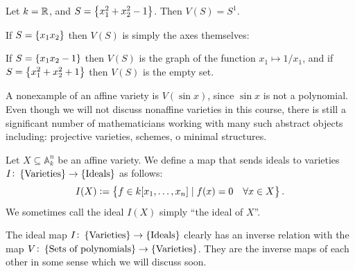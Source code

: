 \documentclass[11pt,a4paper]{article}
\newcommand{\A}{\mathbb A}
\begin{document}
\begin{example}
  Let $k = \mathbb{R}$, and $S = \left\{x_1^2 + x_2^2 - 1\right\}$.
  Then $V(S) = S^1$.
  \begin{center}
  \end{center}
  If $S = \left\{x_1 x_2\right\}$ then $V(S)$ is simply the axes themselves:
  \begin{center}
  \end{center}
  If $S = \left\{x_1 x_2 - 1\right\}$ then $V(S)$ is the graph of the function
  $x_1 \mapsto 1/x_1$,
  and if $S = \left\{x_1^2 + x_2^2 + 1\right\}$ then $V(S)$ is the empty set.
\end{example}

\begin{remark}
  A nonexample of an affine variety is $V(\sin x)$,
  since $\sin x$ is not a polynomial.
  Even though we will not discuss nonaffine varieties in this course,
  there is still a significant number of mathematicians working
  with many such abstract objects
  including: projective varieties, schemes, o minimal structures.
\end{remark}

\begin{definition}
  Let $X \subseteq \A_k^n$ be an affine variety.
  We define a map that sends
  ideals to varieties $I \colon \left\{\text{Varieties}\right\} \to \left\{\text{Ideals}\right\}$
  as follows:
  \[
    I(X) := \left\{f \in k[x_1,\dots,x_n] \mid f(x) = 0 \quad \forall x \in X\right\}.
  \]
  We sometimes call the ideal $I(X)$ simply ``the ideal of $X$''.
\end{definition}

\begin{remark}
  The ideal map $I \colon \left\{\text{Varieties}\right\} \to \left\{\text{Ideals}\right\}$
  clearly has an inverse relation with the map
  $V \colon \left\{\text{Sets of polynomials}\right\} \to \left\{\text{Varieties}\right\}$.
  They are the inverse maps of each other
  in some sense which we will discuss soon.
\end{remark}
\end{document}
